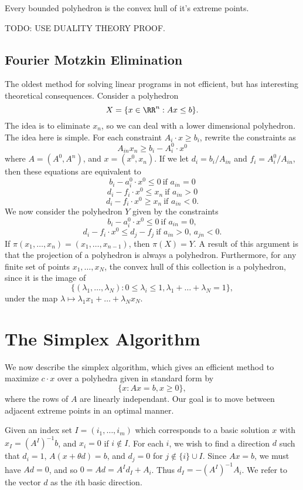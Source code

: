 \begin{lemma}
    Every bounded polyhedron is the convex hull of it's extreme points.
\end{lemma}

TODO: USE DUALITY THEORY PROOF.

\section{Fourier Motzkin Elimination}

The oldest method for solving linear programs in not efficient, but has interesting theoretical consequences. Consider a polyhedron
%
\[ X = \{ x \in \RR^n: Ax \leq b \}. \]
%
The idea is to eliminate $x_n$, so we can deal with a lower dimensional polyhedron. The idea here is simple. For each constraint $A_i \cdot x \geq b_i$, rewrite the constraints as
%
\[ A_{in} x_n \geq b_i - A_i^0 \cdot x^0 \]
%
where $A = (A^0,A^n)$, and $x = (x^0,x_n)$. If we let $d_i = b_i/A_{in}$ and $f_i = A_i^0/A_{in}$, then these equations are equivalent to
%
\[ b_i - a_i^0 \cdot x^0 \leq 0\ \text{if $a_{in} = 0$} \]
\[ d_i - f_i \cdot x^0 \leq x_n\ \text{if $a_{in} > 0$} \]
\[ d_i - f_i \cdot x^0 \geq x_n\ \text{if $a_{in} < 0$}. \]
%
We now consider the polyhedron $Y$ given by the constraints
%
\[ b_i - a_i^0 \cdot x^0 \leq 0\ \text{if $a_{in} = 0$}, \]
%
\[ d_i - f_i \cdot x^0 \leq d_j - f_j\ \text{if $a_{in} > 0$, $a_{jn} < 0$}. \]
%
If $\pi(x_1, \dots, x_n) = (x_1, \dots, x_{n-1})$, then $\pi(X) = Y$. A result of this argument is that the projection of a polyhedron is always a polyhedron. Furthermore, for any finite set of points $x_1, \dots, x_N$, the convex hull of this collection is a polyhedron, since it is the image of
%
\[ \{ (\lambda_1, \dots, \lambda_N) : 0 \leq \lambda_i \leq 1, \lambda_1 + \dots + \lambda_N = 1 \}, \]
%
under the map $\lambda \mapsto \lambda_1 x_1 + \dots + \lambda_N x_N$.

\chapter{The Simplex Algorithm}

We now describe the simplex algorithm, which gives an efficient method to maximize $c \cdot x$ over a polyhedra given in standard form by
%
\[ \{ x : Ax = b, x \geq 0 \}, \]
%
where the rows of $A$ are linearly independant. Our goal is to move between adjacent extreme points in an optimal manner.

Given an index set $I = (i_1, \dots, i_m)$ which corresponds to a basic solution $x$ with $x_I = (A^I)^{-1}b$, and $x_i = 0$ if $i \not \in I$. For each $i$, we wish to find a direction $d$ such that $d_i = 1$, $A(x + \theta d) = b$, and $d_j = 0$ for $j \not \in \{ i \} \cup I$. Since $Ax = b$, we must have $Ad = 0$, and so $0 = Ad = A^Id_I + A_i$. Thus $d_I = -(A^I)^{-1}A_i$. We refer to the vector $d$ as the $i$th basic direction.

